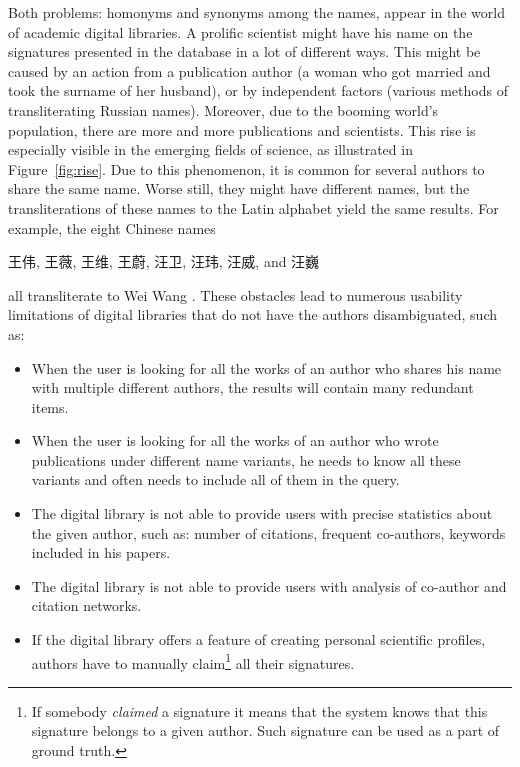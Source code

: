 \documentclass{pracamgr}
\begin{document}
Both problems: homonyms and synonyms among the names, appear in the world of academic
digital libraries. A prolific scientist might have his name on the signatures presented
in the database in a lot of different ways. This might be caused by an action from a
publication author (\eg a woman who got married and took the surname of her husband),
or by independent factors  (\eg various methods of transliterating Russian names). 
Moreover, due to the booming world's population, there are more and more publications
and scientists\citep{therateofgrowth}. This rise is especially visible in
the emerging fields of science, as illustrated in Figure~\ref{fig:rise}. Due to this
phenomenon, it is common for several authors to share the same name. Worse still, they
might have different names, but the transliterations of these names to the Latin
alphabet yield the same results. For example, the eight Chinese names
\begin{CJK}{UTF8}{gbsn}王伟, 王薇, 王维, 王蔚, 汪卫, 汪玮, 汪威, and 汪巍\end{CJK} all
transliterate to Wei Wang \citep{whichwei}. These obstacles lead to numerous usability
limitations of digital libraries that do not have the authors disambiguated, such as:

\begin{itemize}  

    \item When the user is looking for all the works of an author who shares his name
    with multiple different authors, the results will contain many redundant items.

    \item When the user is looking for all the works of an author who wrote publications
    under different name variants, he needs to know all these variants and often needs to
    include all of them in the query.

    \item The digital library is not able to provide users with precise statistics about
    the given author, such as: number of citations, frequent co-authors, keywords included
    in his papers.
    
    \item The digital library is not able to provide users with analysis of co-author
    and citation networks.
    
    \item If the digital library offers a feature of creating personal scientific profiles,
    authors have to manually claim\footnote{If somebody \textit{claimed} a signature
    it means that the system knows that this signature belongs to a given author. Such
    signature can be used as a part of ground truth.} all their signatures.

\end{itemize}
\end{document}

